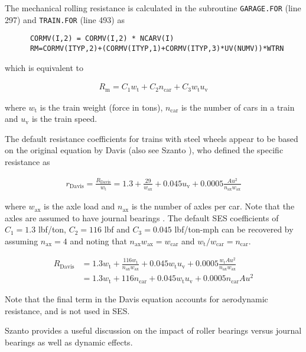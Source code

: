 \documentclass[11pt]{article} %
\begin{document}
The mechanical rolling resistance is calculated in the subroutine {\tt GARAGE.FOR} (line 297) and {\tt TRAIN.FOR} (line 493) as

\begin{lstlisting}
      CORMV(I,2) = CORMV(I,2) * NCARV(I)
      RM=CORMV(ITYP,2)+(CORMV(ITYP,1)+CORMV(ITYP,3)*UV(NUMV))*WTRN
\end{lstlisting}   

\noindent which is equivalent to

\begin{align}
R_\mathrm{m} = C_1 w_\mathrm{t} + C_2 n_\mathrm{car} + C_3 w_\mathrm{t} u_\mathrm{v}
\end{align}

\noindent where $w_\mathrm{t}$ is the train weight (force in tons), $n_\mathrm{car}$ is the number of cars in a train and $u_\mathrm{v}$ is the train speed.

The default resistance coefficients for trains with steel wheels appear to be based on the original equation by Davis \cite{davis1926} (also see Szanto \cite{szanto2016}), who defined the specific resistance as

\begin{align}
r_\mathrm{Davis} = \frac{R_\mathrm{Davis}}{w_\mathrm{t}} =  1.3 + \frac{29}{w_\mathrm{ax}} + 0.045 u_\mathrm{v} + 0.0005 \frac{A u^2}{n_\mathrm{ax} w_\mathrm{ax}}
\end{align}

\noindent where $w_\mathrm{ax}$ is the axle load and $n_\mathrm{ax}$ is the number of axles per car.
Note that the axles are assumed to have journal bearings \cite{szanto2016}.
The default SES coefficients of $C_1 = 1.3$ lbf/ton, $C_2 = 116$ lbf and $C_3 = 0.045$ lbf/ton-mph can be recovered by assuming $n_\mathrm{ax}=4$ and noting that $n_\mathrm{ax} w_\mathrm{ax} = w_\mathrm{car}$ and $w_\mathrm{t}/w_\mathrm{car} = n_\mathrm{car}$.

\begin{align}
R_\mathrm{Davis} & = 1.3 w_\mathrm{t} + \frac{116 w_\mathrm{t}}{n_\mathrm{ax} w_\mathrm{ax}} + 0.045 w_\mathrm{t} u_\mathrm{v} + 0.0005 \frac{w_\mathrm{t} A u^2}{n_\mathrm{ax} w_\mathrm{ax}} \nonumber \\
 &= 1.3 w_\mathrm{t} + 116 n_\mathrm{car} + 0.045 w_\mathrm{t} u_\mathrm{v} + 0.0005 n_\mathrm{car} A u^2 
\end{align}

\noindent Note that the final term in the Davis equation accounts for aerodynamic resistance, and is not used in SES.

Szanto \cite{szanto2016} provides a useful discussion on the impact of roller bearings versus journal bearings as well as dynamic effects.


\end{document}
